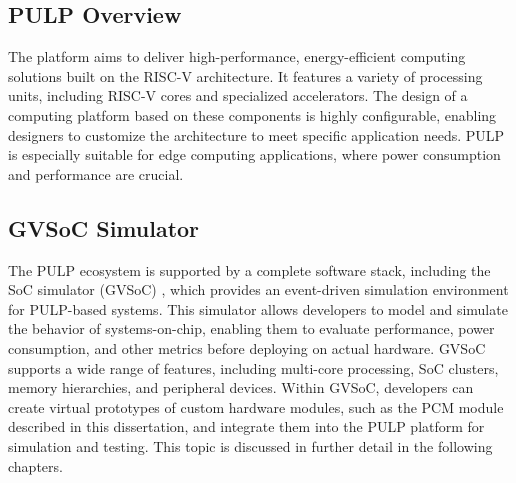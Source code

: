 \subsection{PULP Overview}\label{sec:pulp_ov}%
The platform aims to deliver high-performance, energy-efficient computing solutions built on the RISC-V architecture.
It features a variety of processing units, including RISC-V cores and specialized accelerators. The design of a computing platform based on these components is highly configurable, enabling designers to customize the architecture to meet specific application needs.
PULP is especially suitable for edge computing applications, where power consumption and performance are crucial.

\subsection{GVSoC Simulator}\label{sec:gvsoc}
The PULP ecosystem is supported by a complete software stack, including the SoC simulator (GVSoC) \cite{bruschi_gvsoc_2021}, which provides an event-driven simulation environment for PULP-based systems.
This simulator allows developers to model and simulate the behavior of systems-on-chip, enabling them to evaluate performance, power consumption, and other metrics before deploying on actual hardware.
GVSoC supports a wide range of features, including multi-core processing, SoC clusters, memory hierarchies, and peripheral devices.
Within GVSoC, developers can create virtual prototypes of custom hardware modules, such as the PCM module described in this dissertation, and integrate them into the PULP platform for simulation and testing.
This topic is discussed in further detail in the following chapters.
